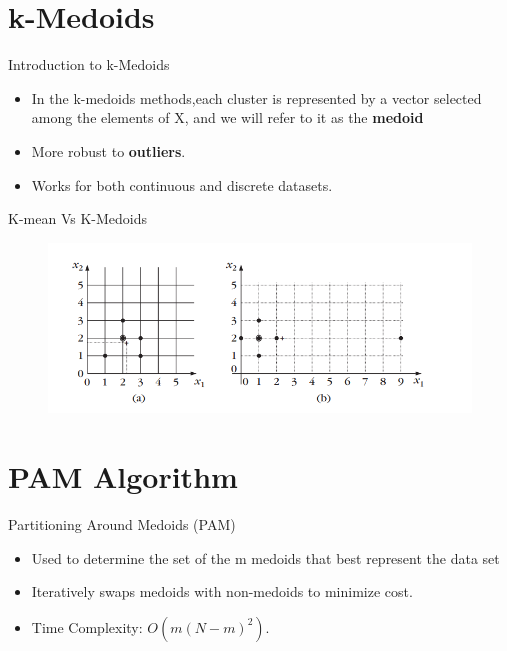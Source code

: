 \documentclass{beamer}
\begin{document}
\section{k-Medoids}
\begin{frame}{Introduction to k-Medoids}
    \begin{itemize}
        \item  In the k-medoids methods,each cluster is represented by a vector selected among the elements of X, and we will refer to it as the \textbf{medoid}
        \item More robust to \textbf{outliers}.
        \item Works for both continuous and discrete datasets.
    \end{itemize}
\end{frame}
\begin{frame}{K-mean Vs K-Medoids}
    \begin{figure}
        \centering
        \includegraphics[width=1\linewidth]{2.png}
        \label{fig:enter-label}
    \end{figure}
\end{frame}

\section{PAM Algorithm}

\begin{frame}{Partitioning Around Medoids (PAM)}
    \begin{itemize}
        \item Used to determine the set of the m medoids that best represent the data set
        \item Iteratively swaps medoids with non-medoids to minimize cost.
        \item Time Complexity: \(O(m(N-m)^2)\).
    \end{itemize}
\end{frame}
\end{document}
